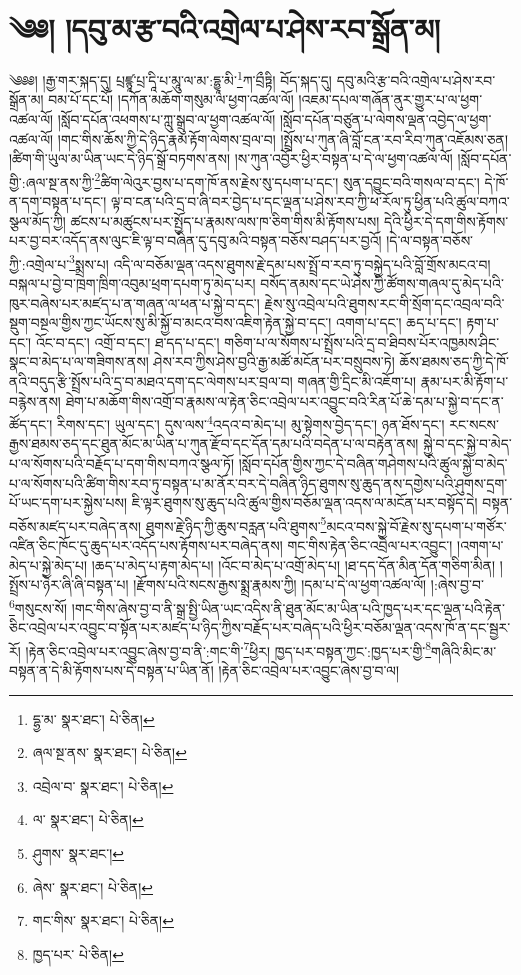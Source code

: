 \setcounter{footnote}{0} 
\chapter{༄༅། །དབུ་མ་རྩ་བའི་འགྲེལ་པ་ཤེས་རབ་སྒྲོན་མ།}༄༅༅། །རྒྱ་གར་སྐད་དུ། པྲཛྙཱ་པྲ་དཱི་པ་མཱུ་ལ་མ་:དྷྱཱ་མི་\footnote{དྷྱ་མ་  སྣར་ཐང་།  པེ་ཅིན། }ཀ་བྲྀཏྟི། བོད་སྐད་དུ། དབུ་མའི་རྩ་བའི་འགྲེལ་པ་ཤེས་རབ་སྒྲོན་མ། བམ་པོ་དང་པོ། །དཀོན་མཆོག་གསུམ་ལ་ཕྱག་འཚལ་ལོ། །འཇམ་དཔལ་གཞོན་ནུར་གྱུར་པ་ལ་ཕྱག་འཚལ་ལོ། །སློབ་དཔོན་འཕགས་པ་ཀླུ་སྒྲུབ་ལ་ཕྱག་འཚལ་ལོ། །སློབ་དཔོན་བཙུན་པ་ལེགས་ལྡན་འབྱེད་ལ་ཕྱག་འཚལ་ལོ། །གང་གིས་ཆོས་ཀྱི་དེ་ཉིད་རྣམ་རྟོག་ལེགས་བྲལ་བ། །སྤྲོས་པ་ཀུན་ཞི་བློ་ངན་རབ་རིབ་ཀུན་འཇོམས་ཅན། །ཚིག་གི་ཡུལ་མ་ཡིན་ཡང་དེ་ཉིད་སྒྲོ་བཏགས་ནས། །ས་ཀུན་འབྱོར་ཕྱིར་བསྟན་པ་དེ་ལ་ཕྱག་འཚལ་ལོ། །སློབ་དཔོན་གྱི་:ཞལ་སྔ་ནས་ཀྱི་\footnote{ཞལ་སྔ་ནས་  སྣར་ཐང་།  པེ་ཅིན། }ཚིག་ལེའུར་བྱས་པ་དག་ཁོ་ནས་རྗེས་སུ་དཔག་པ་དང་། སུན་དབྱུང་བའི་གསལ་བ་དང་། དེ་ཁོ་ན་དག་བསྟན་པ་དང་། ལྟ་བ་ངན་པའི་དྲ་བ་ཞི་བར་བྱེད་པ་དང་ལྡན་པ་ཤེས་རབ་ཀྱི་ཕ་རོལ་ཏུ་ཕྱིན་པའི་ཚུལ་བཀའ་སྩལ་མོད་ཀྱི། ཚངས་པ་མཚུངས་པར་སྤྱོད་པ་རྣམས་ལས་ཁ་ཅིག་གིས་མི་རྟོགས་པས། དེའི་ཕྱིར་དེ་དག་གིས་རྟོགས་པར་བྱ་བར་འདོད་ནས་ལུང་ཇི་ལྟ་བ་བཞིན་དུ་དབུ་མའི་བསྟན་བཅོས་བཤད་པར་བྱའོ། །དེ་ལ་བསྟན་བཅོས་ཀྱི་:འགྲེལ་པ་\footnote{འབྲེལ་བ་  སྣར་ཐང་།  པེ་ཅིན། }སྨྲས་པ། འདི་ལ་བཅོམ་ལྡན་འདས་ཐུགས་རྗེ་དམ་པས་སྤྲོ་བ་རབ་ཏུ་བསྐྱེད་པའི་བློ་གྲོས་མངའ་བ། བསྐལ་པ་བྱེ་བ་ཁྲག་ཁྲིག་འབུམ་ཕྲག་དཔག་ཏུ་མེད་པར། བསོད་ནམས་དང་ཡེ་ཤེས་ཀྱི་ཚོགས་གཞལ་དུ་མེད་པའི་ཁུར་བཞེས་པར་མཛད་པ་ན་གཞན་ལ་ཕན་པ་སྐྱེ་བ་དང་། རྗེས་སུ་འབྲེལ་པའི་ཐུགས་རང་གི་སྲོག་དང་འབྲལ་བའི་སྡུག་བསྔལ་གྱིས་ཀྱང་ཡོངས་སུ་མི་སྐྱོ་བ་མངའ་བས་འཇིག་རྟེན་སྐྱེ་བ་དང་། འགག་པ་དང་། ཆད་པ་དང་། རྟག་པ་དང་། འོང་བ་དང་། འགྲོ་བ་དང་། ཐ་དད་པ་དང་། གཅིག་པ་ལ་སོགས་པ་སྤྲོས་པའི་དྲ་བ་ཐིབས་པོར་འཁྱམས་ཤིང་སྣང་བ་མེད་པ་ལ་གཟིགས་ནས། ཤེས་རབ་ཀྱིས་ཤེས་བྱའི་རྒྱ་མཚོ་མངོན་པར་བསྲུབས་ཏེ། ཆོས་ཐམས་ཅད་ཀྱི་དེ་ཁོ་ནའི་བདུད་རྩི་སྤྲོས་པའི་དྲ་བ་མཐའ་དག་དང་ལེགས་པར་བྲལ་བ། གཞན་གྱི་དྲིང་མི་འཇོག་པ། རྣམ་པར་མི་རྟོག་པ་བརྙེས་ནས། ཐེག་པ་མཆོག་གིས་འགྲོ་བ་རྣམས་ལ་རྟེན་ཅིང་འབྲེལ་པར་འབྱུང་བའི་རིན་པོ་ཆེ་དམ་པ་སྐྱེ་བ་དང་ན་ཚོད་དང་། རིགས་དང་། ཡུལ་དང་། དུས་ལས་\footnote{ལ་  སྣར་ཐང་།  པེ་ཅིན། }འདའ་བ་མེད་པ། མུ་སྟེགས་བྱེད་དང་། ཉན་ཐོས་དང་། རང་སངས་རྒྱས་ཐམས་ཅད་དང་ཐུན་མོང་མ་ཡིན་པ་ཀུན་རྫོབ་དང་དོན་དམ་པའི་བདེན་པ་ལ་བརྟེན་ནས། སྐྱེ་བ་དང་སྐྱེ་བ་མེད་པ་ལ་སོགས་པའི་བརྗོད་པ་དག་གིས་བཀའ་སྩལ་ཏོ། །སློབ་དཔོན་གྱིས་ཀྱང་དེ་བཞིན་གཤེགས་པའི་ཚུལ་སྐྱེ་བ་མེད་པ་ལ་སོགས་པའི་ཚིག་གིས་རབ་ཏུ་བསྟན་པ་མ་ནོར་བར་དེ་བཞིན་ཉིད་ཐུགས་སུ་ཆུད་ནས་དགྱེས་པའི་ཤུགས་དྲག་པོ་ཡང་དག་པར་སྐྱེས་པས། ཇི་ལྟར་ཐུགས་སུ་ཆུད་པའི་ཚུལ་གྱིས་བཅོམ་ལྡན་འདས་ལ་མངོན་པར་བསྟོད་དེ། བསྟན་བཅོས་མཛད་པར་བཞེད་ནས། ཐུགས་རྗེ་ཉིད་ཀྱི་ཆུས་བརླན་པའི་ཐུགས་\footnote{ཤུགས་  སྣར་ཐང་། }མངའ་བས་སྐྱེ་བོ་རྗེས་སུ་དཔག་པ་གཙོར་འཛིན་ཅིང་ཁོང་དུ་ཆུད་པར་འདོད་པས་རྟོགས་པར་བཞེད་ནས། གང་གིས་རྟེན་ཅིང་འབྲེལ་པར་འབྱུང་། །འགག་པ་མེད་པ་སྐྱེ་མེད་པ། །ཆད་པ་མེད་པ་རྟག་མེད་པ། །འོང་བ་མེད་པ་འགྲོ་མེད་པ། །ཐ་དད་དོན་མིན་དོན་གཅིག་མིན། །སྤྲོས་པ་ཉེར་ཞི་ཞི་བསྟན་པ། །རྫོགས་པའི་སངས་རྒྱས་སྨྲ་རྣམས་ཀྱི། །དམ་པ་དེ་ལ་ཕྱག་འཚལ་ལོ། །:ཞེས་བྱ་བ་\footnote{ཞེས་  སྣར་ཐང་།  པེ་ཅིན། }གསུངས་སོ། །གང་གིས་ཞེས་བྱ་བ་ནི་སྒྲ་སྤྱི་ཡིན་ཡང་འདིས་ནི་ཐུན་མོང་མ་ཡིན་པའི་ཁྱད་པར་དང་ལྡན་པའི་རྟེན་ཅིང་འབྲེལ་པར་འབྱུང་བ་སྟོན་པར་མཛད་པ་ཉིད་ཀྱིས་བརྗོད་པར་བཞེད་པའི་ཕྱིར་བཅོམ་ལྡན་འདས་ཁོ་ན་དང་སྦྱར་རོ། །རྟེན་ཅིང་འབྲེལ་པར་འབྱུང་ཞེས་བྱ་བ་ནི་:གང་གི་\footnote{གང་གིས་  སྣར་ཐང་།  པེ་ཅིན། }ཕྱིར། ཁྱད་པར་བསྟན་ཀྱང་:ཁྱད་པར་གྱི་\footnote{ཁྱད་པར་  པེ་ཅིན། }གཞིའི་མིང་མ་བསྟན་ན་དེ་མི་རྟོགས་པས་དེ་བསྟན་པ་ཡིན་ནོ། །རྟེན་ཅིང་འབྲེལ་པར་འབྱུང་ཞེས་བྱ་བ་ལ། 